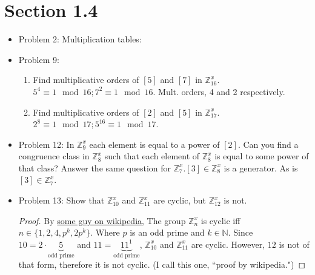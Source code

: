 \documentclass[hidelinks,12pt]{article}
\newcommand{\N}{\mathbb{N}}
\newcommand{\Z}{\mathbb{Z}}
\begin{document}
\section{Section 1.4}
\begin{itemize}
    \item Problem 2: Multiplication tables:\newline{}
    \item Problem 9: \begin{enumerate}[label=\alph*.]
        \item Find multiplicative orders of $[5]$ and $[7]$ in $\Z^x_{16}$.
\newline $5^4\equiv1\mod{16};7^2\equiv1\mod{16}$. Mult. orders, 4 and 2 respectively.
\item Find multiplicative orders of $[2]$ and $[5]$ in $\Z^x_{17}$.\newline $2^8\equiv1\mod{17};5^{16}\equiv1\mod{17}$.
    \end{enumerate}
    \item Problem 12: In $\Z_9^x$ each element is equal to a power of $[2]$. Can you find a congruence class in $\Z_8^x$ such that each element of $\Z_8^x$ is equal to some power of that class? Answer the same question for $\Z_7^x$.\newline $[3]\in\Z_8^x$ is a generator. As is $[3]\in\Z_7^x$.
    \item Problem 13: Show that $\Z_{10}^x$ and $\Z_{11}^x$ are cyclic, but $\Z_{12}^x$ is not.\begin{proof}
    By \href{https://en.wikipedia.org/wiki/Multiplicative_group_of_integers_modulo_n#Cyclic_case}{\color{blue}some guy on wikipedia}, The group $\Z_n^x$ is cyclic iff $n\in\{1,2,4,p^k,2p^k\}$. Where $p$ is an odd prime and $k\in\N$. Since $10=2\cdot\underbrace{5}_{\text{odd prime}}$ and $11=\underbrace{11^1}_{\text{odd prime}}$, $\Z_{10}^x$ and $\Z_{11}^x$ are cyclic. However, $12$ is not of that form, therefore it is not cyclic. (I call this one, ``proof by wikipedia.")
    \end{proof}
\end{itemize}
\end{document}
